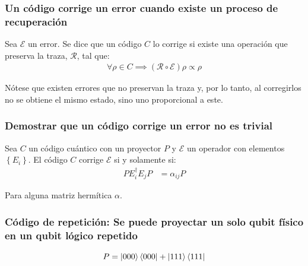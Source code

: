 \documentclass[english,9pt]{Linnaeus}
\begin{document}
    \begin{frame}[allowframebreaks]
      \frametitle{Un código corrige un error cuando existe un proceso de recuperación}
      Sea $\mathcal{E}$ un error. Se dice que un código $C$ lo corrige si existe una operación que preserva la traza, $\mathcal{R}$, tal que:
      \begin{align}
        \forall \rho \in C \implies (\mathcal{R} \circ \mathcal{E}) \rho \propto \rho
      \end{align}

      Nótese que existen errores que no preservan la traza y, por lo tanto, al corregirlos no se obtiene el mismo estado, sino uno proporcional a este.
    \end{frame}

    \begin{frame}[allowframebreaks]
      \frametitle{Demostrar que un código corrige un error no es trivial}
      Sea $C$ un código cuántico con un proyector $P$ y $\mathcal{E}$ un operador con elementos $\left\{ E_i \right\}$. El código $C$ corrige $\mathcal{E}$ si y solamente si:
      \begin{align}
        PE^\dagger_iE_jP &= \alpha_{ij}P
      \end{align}

      Para alguna matriz hermítica $\alpha$.
    \end{frame}

    \begin{frame}[allowframebreaks]
      \frametitle{Código de repetición: Se puede proyectar un solo qubit físico en un qubit lógico repetido}
      \centering
        $$ P = \ket{000}\bra{000} + \ket{111}\bra{111} $$
    \end{frame}
\end{document}
